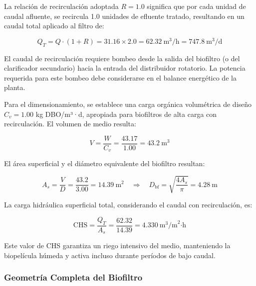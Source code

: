\documentclass[12pt,a4paper]{article}
\begin{document}
La relación de recirculación adoptada $R = 1.0$ significa que por cada unidad de caudal afluente, se recircula 1.0 unidades de efluente tratado, resultando en un caudal total aplicado al filtro de:

\begin{equation}
Q_T = Q \cdot (1 + R) = 31.16 \times 2.0 = 62.32\ \text{m}^3\text{/h} = 747.8\ \text{m}^3\text{/d}
\end{equation}

El caudal de recirculación requiere bombeo desde la salida del biofiltro (o del clarificador secundario) hacia la entrada del distribuidor rotatorio. La potencia requerida para este bombeo debe considerarse en el balance energético de la planta.

Para el dimensionamiento, se establece una carga orgánica volumétrica de diseño $C_v = 1.00$ kg DBO/m³·d, apropiada para biofiltros de alta carga con recirculación. El volumen de medio resulta:

\begin{equation}
V = \frac{W}{C_v} = \frac{43.17}{1.00} = 43.2\ \text{m}^3
\end{equation}

El área superficial y el diámetro equivalente del biofiltro resultan:

\begin{equation}
A_s = \frac{V}{D} = \frac{43.2}{3.00} = 14.39\ \text{m}^2 \quad \Rightarrow \quad D_{\text{bf}} = \sqrt{\frac{4A_s}{\pi}} = 4.28\ \text{m}
\end{equation}

La carga hidráulica superficial total, considerando el caudal con recirculación, es:

\begin{equation}
\text{CHS} = \frac{Q_T}{A_s} = \frac{62.32}{14.39} = 4.330\ \text{m}^3\text{/m}^2\text{·h}
\end{equation}

Este valor de CHS garantiza un riego intensivo del medio, manteniendo la biopelícula húmeda y activa incluso durante períodos de bajo caudal.

\subsubsection*{Geometría Completa del Biofiltro}
\end{document}
